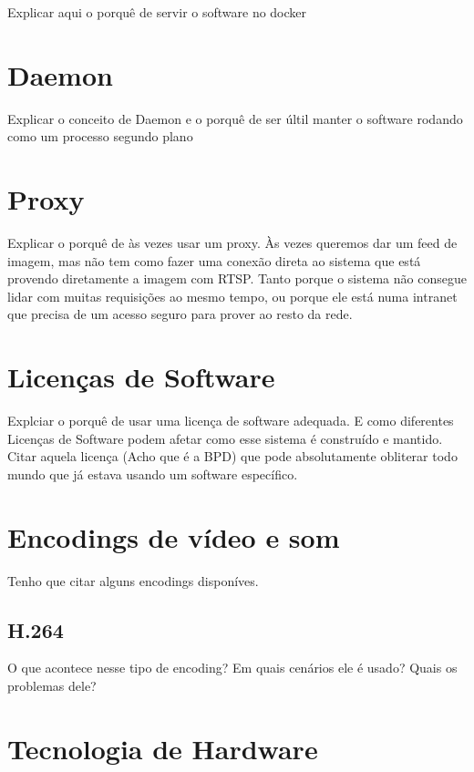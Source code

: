 \documentclass[12pt, %
openright, 
oneside, %
a4paper,    %
brazil]{facom-ufu-abntex2}
\begin{document}
Explicar aqui o porquê de servir o software no docker

\section{Daemon}

Explicar o conceito de Daemon e o porquê de ser últil manter o software rodando
como um processo segundo plano

\section{Proxy}

Explicar o porquê de às vezes usar um proxy. Às vezes queremos dar um feed de
imagem, mas não tem como fazer uma conexão direta ao sistema que está provendo
diretamente a imagem com RTSP. Tanto porque o sistema não consegue lidar com
muitas requisições ao mesmo tempo, ou porque ele está numa intranet que precisa
de um acesso seguro para prover ao resto da rede.

\section{Licenças de Software}

Explciar o porquê de usar uma licença de software adequada. E como diferentes
Licenças de Software podem afetar como esse sistema é construído e mantido.
Citar aquela licença (Acho que é a BPD) que pode absolutamente obliterar todo
mundo que já estava usando um software específico.

\section{Encodings de vídeo e som}

Tenho que citar alguns encodings disponíves.

\subsection{H.264}

O que acontece nesse tipo de encoding? Em quais cenários ele é usado? Quais os
problemas dele?

\section{Tecnologia de Hardware}
\end{document}
